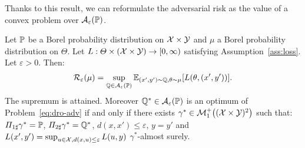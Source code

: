 Thanks to this result, we can reformulate the adversarial risk as the value of a convex problem over $\mathcal{A}_\varepsilon(\mathbb{P})$. %
\begin{prop} 
\label{prop:dro_adv}
Let $\mathbb{P}$ be a Borel probability distribution on $\mathcal{X}\times\mathcal{Y}$ and $\mu$ a Borel probability distribution on $\Theta$. Let $L:\Theta\times(\mathcal{X}\times\mathcal{Y})\to [0,\infty)$ satisfying Assumption~\ref{ass:loss}. Let $\varepsilon>0$. Then:
\begin{align}
\label{eq:dro-adv}
\risk_\varepsilon(\mu)= \sup_{\QQ\in \mathcal{A}_{\varepsilon}(\PP)}\mathbb{E}_{(x',y')\sim\QQ,\theta\sim\mu}\left[\loss(\theta,(x',y'))\right].
\end{align}
The supremum is attained. Moreover $\mathbb{Q}^*\in \mathcal{A}_{\varepsilon}(\mathbb{P})$ is an optimum of Problem~\eqref{eq:dro-adv} if and only if there exists $\gamma^*\in\mathcal{M}^+_1\left((\XX\times\YY)^2\right)$ such that: $\Pi_{1\sharp}\gamma^*=\mathbb{P}$, $\Pi_{2\sharp}\gamma^*=\mathbb{Q}^*$, $d(x,x')\leq\varepsilon$, $y=y'$ and  $L(x',y')=\sup_{\substack{u\in\mathcal{X},d(x,u)\leq\varepsilon}}L(u,y)$ $\gamma^*$-almost surely.
\end{prop}

